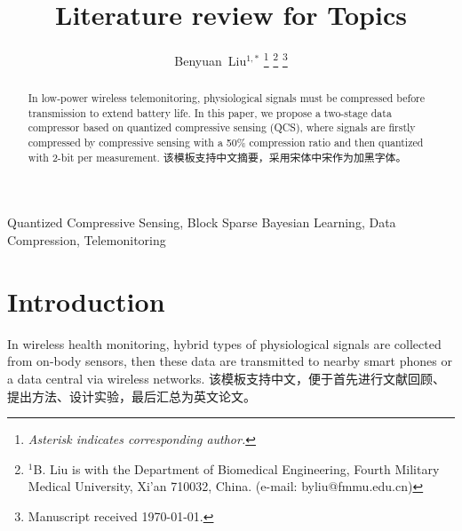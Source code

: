 \documentclass[twocolumn,letterpaper,10pt]{IEEEtran}
\begin{document}
\title{Literature review for Topics}
\author{%
Benyuan~Liu$^{1,*}$%
\thanks{\textit{Asterisk indicates corresponding author.}}%
\thanks{$^1$B. Liu is with the Department of Biomedical Engineering,
Fourth Military Medical University, Xi'an 710032, China. (e-mail: byliu@fmmu.edu.cn)}
\thanks{Manuscript received \today{}.}%
}


\maketitle


\begin{abstract}
\boldmath
In low-power wireless telemonitoring,
physiological signals must be compressed before transmission to extend battery life.
In this paper, we propose a two-stage data compressor based on quantized compressive sensing (QCS),
where signals are firstly compressed by compressive sensing with a 50\% compression ratio
and then quantized with 2-bit per measurement. 该模板支持中文摘要，采用宋体中宋作为加黑字体。
\end{abstract}
\begin{IEEEkeywords}
    Quantized Compressive Sensing, Block Sparse Bayesian Learning, Data Compression, Telemonitoring
\end{IEEEkeywords}


\section{Introduction}

In wireless health monitoring, hybrid types of physiological signals are collected
from on-body sensors, then these data are transmitted to nearby smart phones or a data central via wireless networks.
该模板支持中文，便于首先进行文献回顾、提出方法、设计实验，最后汇总为英文论文。
\end{document}
